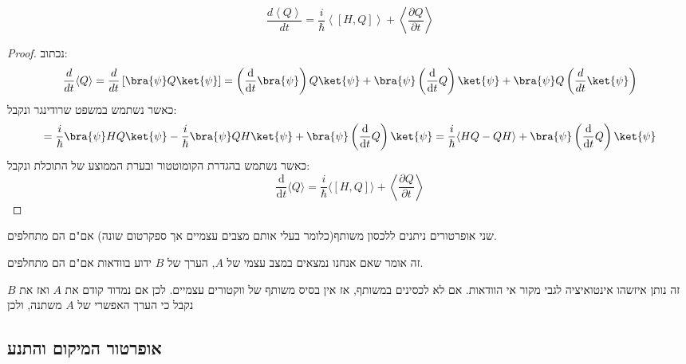 \documentclass{tstextbook}
\begin{document}
\begin{proposition}
$$\frac{d\left<Q\right>}{d t}=\frac{i}{\hbar}\left<[H,Q]\right>+\left<\frac{\partial Q}{\partial t}\right>$$

\end{proposition}
\begin{proof}
נכתוב:
$$\begin{gather}\frac{d}{dt}\langle Q \rangle =\frac{d}{dt}\left[ \bra{\psi} Q\ket{\psi}  \right]=\left( \frac{\mathrm{d} }{\mathrm{d} t} \bra{\psi} \right) Q\ket{\psi} +\bra{\psi} \left( \frac{\mathrm{d} }{\mathrm{d} t} Q \right)\ket{\psi} +\bra{\psi} Q\left( \frac{d}{dt}\ket{\psi}  \right) 
\end{gather}$$
כאשר נשתמש במשפט שרודינגר ונקבל:
$$=\frac{i}{\hbar}\bra{\psi} HQ \ket{\psi} -\frac{i}{\hbar}\bra{\psi} QH \ket{\psi} +\bra{\psi} \left( \frac{\mathrm{d} }{\mathrm{d} t} Q \right)\ket{\psi} =\frac{i}{\hbar}\langle HQ-QH \rangle +\bra{\psi} \left( \frac{\mathrm{d} }{\mathrm{d} t} Q \right)\ket{\psi}   $$
כאשר נשתמש בהגדרת הקומוטטור ובערת הממוצע של התוכלת ונקבל:
$$\frac{\mathrm{d} }{\mathrm{d} t} \langle Q \rangle =\frac{i}{\hbar}\langle [H,Q] \rangle + \left\langle  \frac{\partial Q}{\partial t}   \right\rangle $$

\end{proof}
\begin{proposition}
שני אופרטורים ניתנים ללכסון משותף(כלומר בעלי אותם מצבים עצמיים אך ספקרטום שונה) אם"ם הם מתחלפים.

\end{proposition}
\begin{remark}
זה אומר שאם אנחנו נמצאים במצב עצמי של \(A\), הערך של \(B\) ידוע בוודאות אם"ם הם מתחלפים.

\end{remark}
זה נותן איזשהו אינטואיציה לגבי מקור אי הוודאות. אם לא לכסינים במשותף, אז אין בסיס משותף של ווקטורים עצמיים. לכן אם נמדוד קודם את \(A\) ואז את \(B\) נקבל כי הערך האפשרי של \(A\) משתנה, ולכן 

\subsection{אופרטור המיקום והתנע}
\end{document}
